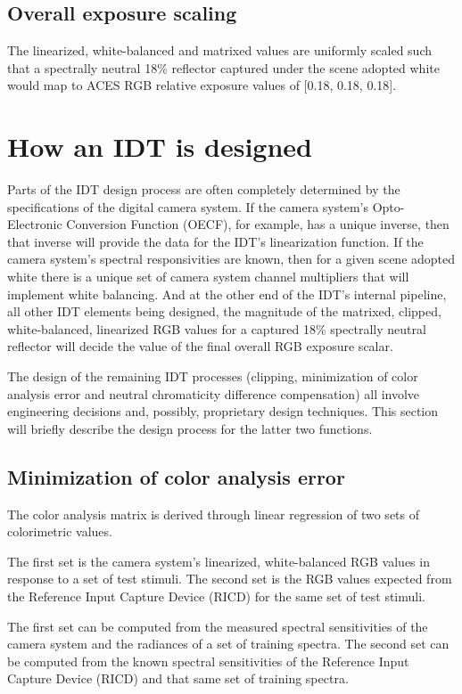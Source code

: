 \subsection{Overall exposure scaling}
The linearized, white-balanced and matrixed values are uniformly scaled such that a spectrally neutral 18\% reflector captured under the scene adopted white would map to ACES RGB relative exposure values of [0.18, 0.18, 0.18].

\section{How an IDT is designed}
Parts of the IDT design process are often completely determined by the specifications of the digital camera system. If the camera system's Opto-Electronic Conversion Function (OECF), for example, has a unique inverse, then that inverse will provide the data for the IDT's linearization function. If the camera system's spectral responsivities are known, then for a given scene adopted white there is a unique set of camera system channel multipliers that will implement white balancing. And at the other end of the IDT's internal pipeline, all other IDT elements being designed, the magnitude of the matrixed, clipped, white-balanced, linearized RGB values for a captured 18\% spectrally neutral reflector will decide the value of the final overall RGB exposure scalar.

The design of the remaining IDT processes (clipping, minimization of color analysis error and neutral chromaticity difference compensation) all involve engineering decisions and, possibly, proprietary design techniques. This section will briefly describe the design process for the latter two functions.

\subsection{Minimization of color analysis error}
The color analysis matrix is derived through linear regression of two sets of colorimetric values. 

The first set is the camera system's linearized, white-balanced RGB values in response to a set of test stimuli. The second set is the RGB values expected from the Reference Input Capture Device (RICD) for the same set of test stimuli.

The first set can be computed from the measured spectral sensitivities of the camera system and the radiances of a set of training spectra. The second set can be computed from the known spectral sensitivities of the Reference Input Capture Device (RICD) and that same set of training spectra.

